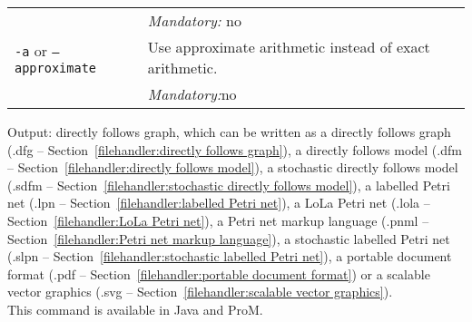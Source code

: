 {\begin{tabularx}{\linewidth}{lX}
&\textit{Mandatory:} \quad no\\
\texttt{-a} or \texttt{--approximate} & Use approximate arithmetic instead of exact arithmetic.\\
&\textit{Mandatory:}\quad no\\
\bottomrule
\end{tabularx}
\noindent Output: directly follows graph, which can be written as a directly follows graph (.dfg -- Section~\ref{filehandler:directly follows graph}), a directly follows model (.dfm -- Section~\ref{filehandler:directly follows model}), a stochastic directly follows model (.sdfm -- Section~\ref{filehandler:stochastic directly follows model}), a labelled Petri net (.lpn -- Section~\ref{filehandler:labelled Petri net}), a LoLa Petri net (.lola -- Section~\ref{filehandler:LoLa Petri net}), a Petri net markup language (.pnml -- Section~\ref{filehandler:Petri net markup language}), a stochastic labelled Petri net (.slpn -- Section~\ref{filehandler:stochastic labelled Petri net}), a portable document format (.pdf -- Section~\ref{filehandler:portable document format}) or a scalable vector graphics (.svg -- Section~\ref{filehandler:scalable vector graphics}).
\\This command is available in Java and ProM.
}
